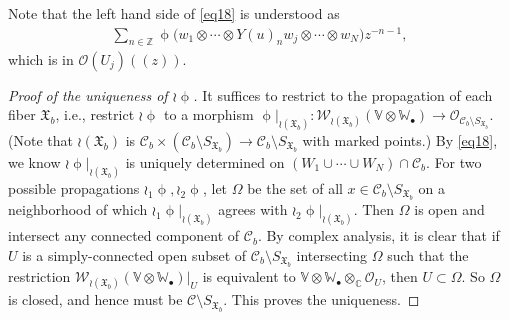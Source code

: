 \documentclass[12pt,a4paper,notitlepage]{article}
\theoremstyle{definition}
\theoremstyle{plain}
\newcommand{\fk}{\mathfrak}
\newcommand{\mc}{\mathcal}
\newcommand{\scr}{\mathscr}
\newcommand{\blt}{\bullet}
\newcommand{\Vbb}{\mathbb V}
\newcommand{\Wbb}{\mathbb W}
\newcommand{\Cbb}{\mathbb C}
\newcommand{\Zbb}{\mathbb Z}
\newcommand{\SXb}{{S_{\fk X_b}}}
\numberwithin{equation}{section}
\begin{document}
Note that the left hand side of \eqref{eq18} is understood as
\begin{align*}
\sum_{n\in\Zbb} \upphi\big(w_1\otimes\cdots\otimes Y(u)_nw_j\otimes\cdots\otimes w_N\big)z^{-n-1},
\end{align*}
which is in $\scr O(U_j)((z))$.

\begin{proof}[Proof of the uniqueness of $\wr\upphi$]
It suffices to restrict to the propagation of each fiber $\fk X_b$, i.e., restrict $\wr\upphi$ to a morphism $\upphi|_{\wr(\fk X_b)}:\scr W_{\wr(\fk X_b)}(\Vbb\otimes\Wbb_\blt)\rightarrow\scr O_{\mc C_b\setminus \SXb}$.	(Note that $\wr(\fk X_b)$ is $\mc C_b\times(\mc C_b\setminus\SXb)\rightarrow\mc C_b\setminus\SXb$ with marked points.) By \eqref{eq18}, we know $\wr\upphi|_{\wr(\fk X_b)}$ is uniquely determined on $(W_1\cup\cdots\cup W_N)\cap\mc C_b$. For two possible propagations $\wr_1\upphi,\wr_2\upphi$, let $\Omega$ be the set of all $x\in\mc C_b\setminus\SXb$ on a neighborhood of which $\wr_1\upphi|_{\wr(\fk X_b)}$ agrees with $\wr_2\upphi|_{\wr(\fk X_b)}$. Then $\Omega$ is open and  intersect any connected component of $\mc C_b$. By complex analysis, it is clear that if $U$ is a simply-connected open subset of $\mc C_b\setminus\SXb$ intersecting $\Omega$ such that the restriction $\scr W_{\wr(\fk X_b)}(\Vbb\otimes\Wbb_\blt)|_U$ is equivalent to $\Vbb\otimes\Wbb_\blt\otimes_\Cbb\scr O_U$, then $U\subset\Omega$. So $\Omega$ is closed, and hence must be $\mc C\setminus\SXb$. This proves the uniqueness.
\end{proof}
\end{document}
